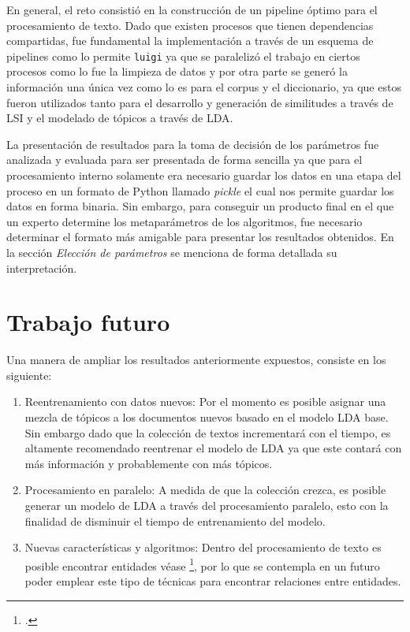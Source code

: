 En general, el reto consistió en la construcción de un pipeline óptimo para el procesamiento de texto. Dado que existen procesos que tienen dependencias compartidas, fue fundamental la implementación a través de un esquema de pipelines como lo permite  \texttt{luigi} ya que se paralelizó el trabajo en ciertos procesos como lo fue la limpieza de datos y por otra parte se generó la información una única vez como lo es para el corpus y el diccionario, ya que estos fueron utilizados tanto para el desarrollo y generación de similitudes a través de LSI y el modelado de tópicos a través de LDA.

La presentación de resultados para la toma de decisión de los parámetros fue analizada y evaluada para ser presentada de forma sencilla ya que para el procesamiento interno solamente era necesario guardar los datos en una etapa del proceso en un formato de Python llamado \textit{pickle} el cual nos permite guardar los datos en forma binaria. Sin embargo, para conseguir un producto final en el que un experto determine los metaparámetros de los algoritmos, fue necesario determinar el formato más amigable para presentar los resultados obtenidos. En la sección \textit{Elección de parámetros} se menciona de forma detallada su interpretación. 

\section{Trabajo futuro}

Una manera de ampliar los resultados anteriormente expuestos, consiste en los siguiente:

\begin{enumerate}

	\item Reentrenamiento con datos nuevos: Por el momento es posible asignar una mezcla de tópicos a los documentos nuevos basado en el modelo LDA base. Sin embargo dado que la colección de textos incrementará con el tiempo, es altamente recomendado reentrenar el modelo de LDA ya que este contará con más información y probablemente con más tópicos. 
	\item Procesamiento en paralelo: A medida de que la colección crezca, es posible generar un modelo de LDA a través del procesamiento paralelo, esto con la finalidad de disminuir el tiempo de entrenamiento del modelo.
	\item Nuevas características y algoritmos: Dentro del procesamiento de texto es posible encontrar entidades véase \footcite{https://en.wikipedia.org/wiki/Named-entity_recognition}, por lo que se contempla en un futuro poder emplear este tipo de técnicas para encontrar relaciones entre entidades. 
	
\end{enumerate}

